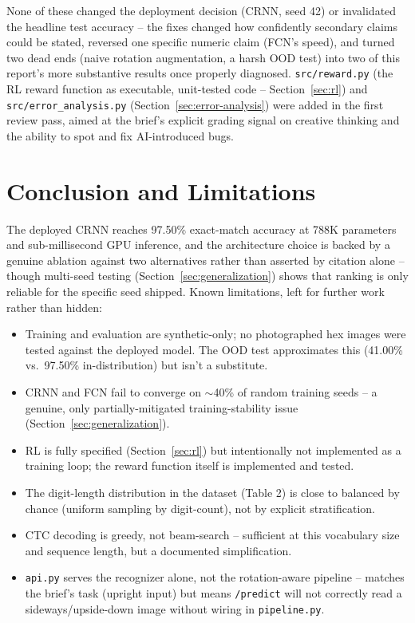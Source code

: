 \documentclass[11pt]{article}
\begin{document}
None of these changed the deployment decision (CRNN, seed 42) or invalidated the
headline test accuracy -- the fixes changed how confidently secondary claims could be
stated, reversed one specific numeric claim (FCN's speed), and turned two dead ends
(naive rotation augmentation, a harsh OOD test) into two of this report's more
substantive results once properly diagnosed. \texttt{src/reward.py} (the RL reward
function as executable, unit-tested code -- Section~\ref{sec:rl}) and
\texttt{src/error\_analysis.py} (Section~\ref{sec:error-analysis}) were added in the
first review pass, aimed at the brief's explicit grading signal on creative thinking
and the ability to spot and fix AI-introduced bugs.

\section{Conclusion and Limitations}

The deployed CRNN reaches 97.50\% exact-match accuracy at 788K parameters and
sub-millisecond GPU inference, and the architecture choice is backed by a genuine
ablation against two alternatives rather than asserted by citation alone -- though
multi-seed testing (Section~\ref{sec:generalization}) shows that ranking is only
reliable for the specific seed shipped. Known limitations, left for further work
rather than hidden:

\begin{itemize}
    \item Training and evaluation are synthetic-only; no photographed hex images were
    tested against the deployed model. The OOD test approximates this (41.00\% vs.\
    97.50\% in-distribution) but isn't a substitute.
    \item CRNN and FCN fail to converge on $\sim$40\% of random training seeds -- a
    genuine, only partially-mitigated training-stability issue (Section~\ref{sec:generalization}).
    \item RL is fully specified (Section~\ref{sec:rl}) but intentionally not implemented
    as a training loop; the reward function itself is implemented and tested.
    \item The digit-length distribution in the dataset (Table 2) is close to balanced by
    chance (uniform sampling by digit-count), not by explicit stratification.
    \item CTC decoding is greedy, not beam-search -- sufficient at this vocabulary size
    and sequence length, but a documented simplification.
    \item \texttt{api.py} serves the recognizer alone, not the rotation-aware pipeline
    -- matches the brief's task (upright input) but means \texttt{/predict} will not
    correctly read a sideways/upside-down image without wiring in \texttt{pipeline.py}.
\end{itemize}
\end{document}
